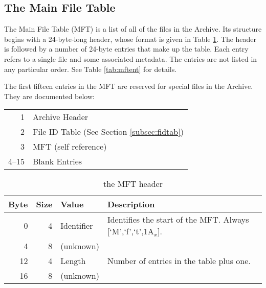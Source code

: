 \subsection{The Main File Table}
\label{subsec:mft}

The Main File Table (MFT) is a list of all of the files in the Archive.  Its
structure begins with a 24-byte-long header, whose format is given in Table
\ref{tab:mfthead}.  The header is followed by a number of 24-byte entries that
make up the table.  Each entry refers to a single file and some associated
metadata.  The entries are not listed in any particular order.  See Table
\ref{tab:mftent} for details.

The first fifteen entries in the MFT are reserved for special files in the
Archive.  They are documented below:
\\

\begin{tabular}{rl}
	\hline
	1     & Archive Header  \\
	2     & File ID Table (See Section \ref{subsec:fidtab}) \\
	3     & MFT (self reference)  \\
	4--15 & Blank Entries  \\
	\hline
\end{tabular}

\begin{table}[pb]
	\caption{the MFT header}
	\label{tab:mfthead}
	
	\begin{tabular}{|r|r|l|p{3in}|}
		\hline
		\textbf{Byte} & \textbf{Size} & \textbf{Value} & \textbf{Description} \\
		\hline
		 0 & 4 & Identifier & Identifies the start of the MFT.  Always
		                      [`M',`f',`t',1A$_x$].  \\
		\hline
		 4 & 8 & (unknown)  & \\
		\hline
		12 & 4 & Length     & Number of entries in the table plus one.  \\
		\hline
		16 & 8 & (unknown)  & \\
		\hline
	\end{tabular}
\end{table}

